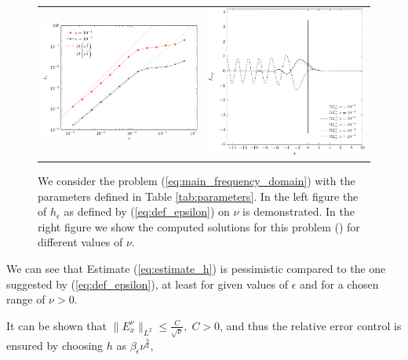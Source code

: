 \begin{figure}
\begin{tabular}{cc}
\includegraphics[height=0.32\textwidth]{pics_frequency_domain/h_nu.pdf}
&
\includegraphics[height=0.32\textwidth]{pics_frequency_domain/res_sol.pdf}
\end{tabular}
\caption{We consider the problem (\ref{eq:main_frequency_domain}) with the parameters 
defined in Table \ref{tab:parameters}. In the left figure the  of $h_{\epsilon}$ as defined by (\ref{eq:def_epsilon}) on $\nu$ is demonstrated.  
In the right figure we show the computed solutions for this problem () for different values of $\nu$. }
\label{fig:dependence}
\end{figure}
We can see that Estimate (\ref{eq:estimate_h}) is pessimistic compared to the one suggested by (\ref{eq:def_epsilon}), 
at least for given values of $\epsilon$ and for a chosen range of $\nu>0$.
\begin{remark}
It can be shown that $\|E^{\nu}_{x}\|_{L^2}\leq \frac{C}{\sqrt{\nu}},\; C>0$, 
and thus the relative error control
\bealn
 \leq \epsilon
\eealn
 is ensured by choosing $h$ as $\beta_{\epsilon}\nu^{\frac{3}{4}}$, 
\end{remark}

